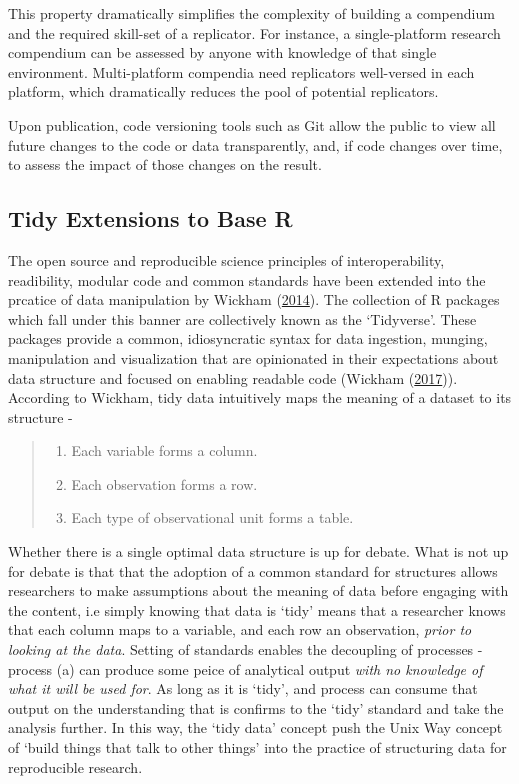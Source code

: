 \documentclass[11pt,preprint, authoryear]{elsarticle}
\numberwithin{equation}{section}
\numberwithin{figure}{section}
\numberwithin{table}{section}
\def\tightlist{} %
\begin{document}
This property dramatically simplifies the complexity of building a
compendium and the required skill-set of a replicator. For instance, a
single-platform research compendium can be assessed by anyone with
knowledge of that single environment. Multi-platform compendia need
replicators well-versed in each platform, which dramatically reduces the
pool of potential replicators.

Upon publication, code versioning tools such as Git allow the public to
view all future changes to the code or data transparently, and, if code
changes over time, to assess the impact of those changes on the result.

\subsection{Tidy Extensions to Base R}\label{tidy-extensions-to-base-r}

The open source and reproducible science principles of interoperability,
readibility, modular code and common standards have been extended into
the prcatice of data manipulation by Wickham
(\protect\hyperlink{ref-Wickham2014}{2014}). The collection of R
packages which fall under this banner are collectively known as the
`Tidyverse'. These packages provide a common, idiosyncratic syntax for
data ingestion, munging, manipulation and visualization that are
opinionated in their expectations about data structure and focused on
enabling readable code (Wickham
(\protect\hyperlink{ref-Wickham2017}{2017})). According to Wickham, tidy
data intuitively maps the meaning of a dataset to its structure -

\begin{quote}
\begin{enumerate}
\def\labelenumi{\arabic{enumi}.}
\tightlist
\item
  Each variable forms a column.
\item
  Each observation forms a row.
\item
  Each type of observational unit forms a table.
\end{enumerate}
\end{quote}

Whether there is a single optimal data structure is up for debate. What
is not up for debate is that that the adoption of a common standard for
structures allows researchers to make assumptions about the meaning of
data before engaging with the content, i.e simply knowing that data is
`tidy' means that a researcher knows that each column maps to a
variable, and each row an observation, \emph{prior to looking at the
data}. Setting of standards enables the decoupling of processes -
process (a) can produce some peice of analytical output \emph{with no
knowledge of what it will be used for}. As long as it is `tidy', and
process can consume that output on the understanding that is confirms to
the `tidy' standard and take the analysis further. In this way, the
`tidy data' concept push the Unix Way concept of `build things that talk
to other things' into the practice of structuring data for reproducible
research.
\end{document}
